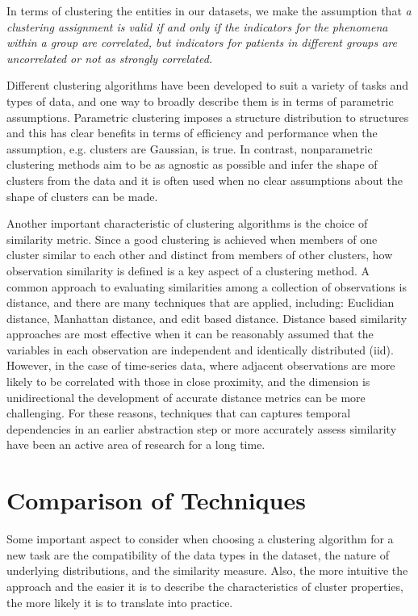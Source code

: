 In terms of clustering the entities in our datasets, we make the assumption that \emph{a clustering assignment is valid if and only if the indicators for the phenomena within a group are correlated, but indicators for patients in different groups are uncorrelated or not as strongly correlated.}

Different clustering algorithms have been developed to suit a variety of tasks and types of data, and one way to broadly describe them is in terms of parametric assumptions.
Parametric clustering imposes a structure distribution to structures and this has clear benefits in terms of efficiency and performance when the assumption, e.g. clusters are Gaussian, is true.  In contrast, nonparametric clustering methods aim to be as agnostic as possible and infer the shape of clusters from the data and it is often used when no clear assumptions about the shape of clusters can be made.

Another important characteristic of clustering algorithms is the choice of similarity metric.  Since a good clustering is achieved when members of one cluster similar to each other and distinct from members of other clusters, how observation similarity is defined is a key aspect of a clustering method.  A common approach to evaluating similarities among a collection of observations is distance, and there are many techniques that are applied, including: Euclidian distance, Manhattan distance, and edit based distance.  Distance based similarity approaches are most effective when it can be reasonably assumed that the variables in each observation are independent and identically distributed (iid).  However, in the case of time-series data, where adjacent observations are more likely to be correlated with those in close proximity, and the dimension is unidirectional the development of accurate distance metrics can be more challenging.  For these reasons, techniques that can captures temporal dependencies in an earlier abstraction step or more accurately assess similarity have been an active area of research for a long time.

\section{Comparison of Techniques}
Some important aspect to consider when choosing a clustering algorithm for a new task are the compatibility of the data types in the dataset, the nature of underlying distributions, and the similarity measure.  Also, the more intuitive the approach and the easier it is to describe the characteristics of cluster properties, the more likely it is to translate into practice.

